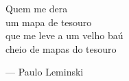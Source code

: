 \cleardoublepage{}
\thispagestyle{empty}

\clearpage
\vspace*{\fill}
\begin{center}
    \begin{minipage}{0.4\linewidth}
        \begin{flushleft}
            Quem me dera\\
            um mapa de tesouro\\
            que me leve a um velho baú\\
            cheio de mapas do tesouro\\
        \end{flushleft}
        \begin{flushright}
            --- Paulo Leminski
        \end{flushright}
    \end{minipage}%
\end{center}
\vfill